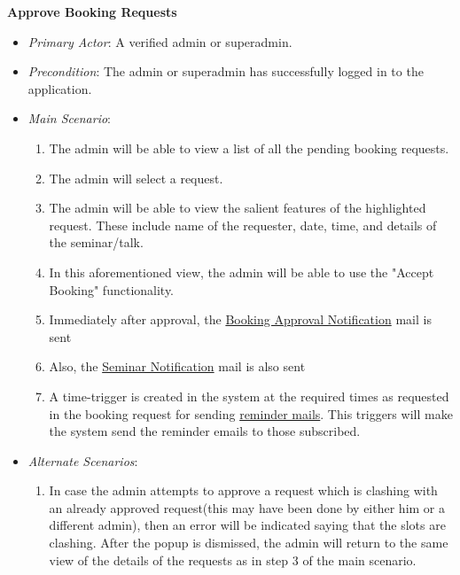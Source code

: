 \documentclass{article}
\begin{document}
\textbf{Approve Booking Requests}
\label{ucapprovebookingrequests}
\begin{itemize}
    \item \textit{Primary Actor}: A verified admin or superadmin. 
    \item \textit{Precondition}: The admin or superadmin has successfully logged in to the application. 
    \item \textit{Main Scenario}: 
    \begin{enumerate}
        \item The admin will be able to view a list of all the pending booking requests. 
        \item The admin will select a request. 
        \item The admin will be able to view the salient features of the highlighted request. These include name of the requester, date, time, and details of the seminar/talk. 
        \item In this aforementioned view, the admin will be able to use the "Accept Booking" functionality. 
        \item Immediately after approval, the \hyperref[ucbookingapprovalnotification]{Booking Approval Notification} mail is sent
        \item Also, the \hyperref[ucseminarnotification]{Seminar Notification} mail is also sent
        \item A time-trigger is created in the system at the required times as requested in the booking request for sending \hyperref[ucseminarreminder]{reminder mails}. This triggers will make the system send the reminder emails to those subscribed. 
        
    \end{enumerate}
    \item \textit{Alternate Scenarios}:
    \begin{enumerate}
        \item In case the admin attempts to approve a request which is clashing with an already approved request(this may have been done by either him or a different admin), then an error will be indicated saying that the slots are clashing. After the popup is dismissed, the admin will return to the same view of the details of the requests as in step 3 of the main scenario.
    \end{enumerate}
\end{itemize}
\end{document}
